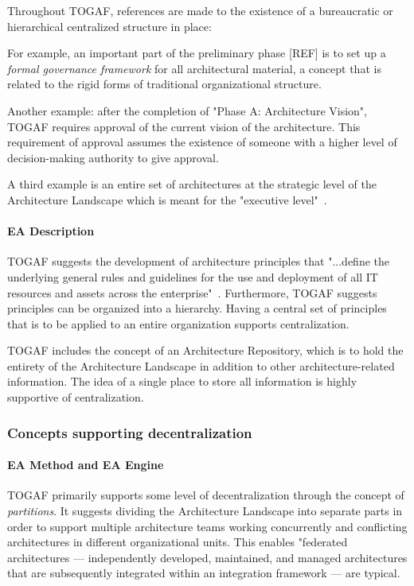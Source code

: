 Throughout TOGAF, references are made to the existence of a bureaucratic or hierarchical centralized structure in place: 

For example, an important part of the preliminary phase [REF] is to set up a \textit{formal governance framework} for all architectural material, a concept that is related to the rigid forms of traditional organizational structure. 

Another example: after the completion of "Phase A: Architecture Vision", TOGAF requires approval of the current vision of the architecture. This requirement of approval assumes the existence of someone with a higher level of decision-making authority to give approval. 

A third example is an entire set of architectures at the strategic level of the Architecture Landscape which is meant for the "executive level"~\cite{togaf9.1}.

\paragraph*{EA Description}
TOGAF suggests the development of architecture principles that "...define the underlying general rules and guidelines for the use and deployment of all IT resources and assets across the enterprise"~\cite{togaf9.1}. Furthermore, TOGAF suggests principles can be organized into a hierarchy. Having a central set of principles that is to be applied to an entire organization supports centralization.

TOGAF includes the concept of an Architecture Repository, which is to hold the entirety of the Architecture Landscape in addition to other architecture-related information. The idea of a single place to store all information is highly supportive of centralization. 

\subsubsection{Concepts supporting decentralization}
\paragraph*{EA Method and EA Engine}
TOGAF primarily supports some level of decentralization through the concept of \textit{partitions}. It suggests dividing the Architecture Landscape into separate parts in order to support multiple architecture teams working concurrently and conflicting architectures in different organizational units. This enables "federated architectures — independently developed, maintained, and managed architectures that are subsequently integrated within an integration framework — are typical. 

